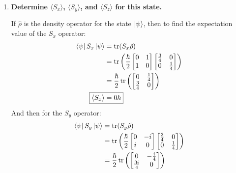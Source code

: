 \documentclass[11pt]{article}
\DeclareMathOperator{\tr}{tr}
\begin{document}
\begin{enumerate}[label=\textbf{\arabic*.}, start=2]
{\begin{enumerate}[label=\textbf{(\alph*)}]
{\begin{align*}
                        &\neq\begin{bmatrix}\frac{9}{16} & 0 \\ 0 & \frac 1 8\end{bmatrix} \\
                    \end{align*}
                    \(\hat\rho\neq\hat\rho^2\), so this density operator describes a mixed state.
                }
                \item{
                    \textbf{\boldmath Determine \(\langle S_x\rangle\), \(\langle S_y\rangle\), and \(\langle S_z\rangle\) for this state.}
                    \par
                    If \(\hat\rho\) is the density operator for the state \(\ket{\psi}\), then to find the expectation value of the \(S_x\) operator:
                    \begin{align*}
                        \bra{\psi}S_x\ket{\psi}&=\tr(S_x\hat\rho) \\
                        &=\tr\left(\frac{\hbar}{2}\begin{bmatrix}0 & 1 \\ 1 & 0\end{bmatrix}\begin{bmatrix}\frac 3 4 & 0 \\ 0 & \frac 1 4\end{bmatrix}\right) \\
                        &=\frac{\hbar}{2}\tr\left(\begin{bmatrix}0 & \frac 1 4 \\ \frac 3 4 & 0\end{bmatrix}\right) \\
                        \Aboxed{\langle S_x\rangle&=0\hbar}
                    \end{align*}
                    And then for the \(S_y\) operator:
                    \begin{align*}
                        \bra{\psi}S_y\ket{\psi}&=\tr(S_y\hat\rho) \\
                        &=\tr\left(\frac{\hbar}{2}\begin{bmatrix}0 & -i \\ i & 0\end{bmatrix}\begin{bmatrix}\frac 3 4 & 0 \\ 0 & \frac 1 4\end{bmatrix}\right) \\
                        &=\frac{\hbar}{2}\tr\left(\begin{bmatrix}0 & -\frac{i}{4} \\ \frac{3i}{4} & 0\end{bmatrix}\right) \\

\end{align*}}
\end{enumerate}}
\end{enumerate}
\end{document}
